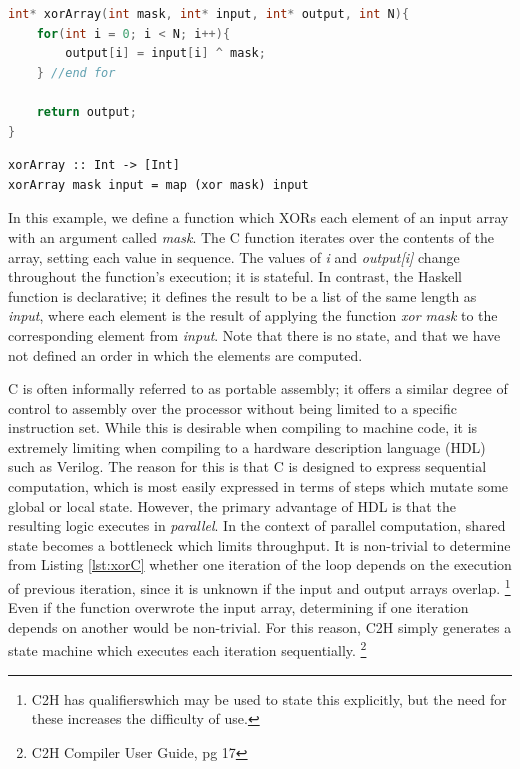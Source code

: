 \documentclass[english,onecolumn]{article}
\begin{document}
\begin{lstlisting}[language=C, caption={XORing an array in C.}, label={lst:xorC}]
int* xorArray(int mask, int* input, int* output, int N){
    for(int i = 0; i < N; i++){
        output[i] = input[i] ^ mask;
    } //end for

    return output;
}
\end{lstlisting}

\begin{lstlisting}[caption={XORing an array in Haskell.}, label={lst:xorH}]
xorArray :: Int -> [Int]
xorArray mask input = map (xor mask) input
\end{lstlisting}

In this example, we define a function which XORs each element of an input array with an argument called \textit{mask}. The C function iterates over the contents of the array, setting each value in sequence. The values of \textit{i} and \textit{output[i]} change throughout the function's execution; it is stateful. In contrast, the Haskell function is declarative; it defines the result to be a list of the same length as \textit{input}, where each element is the result of applying the function \textit{xor mask} to the corresponding element from \textit{input}. Note that there is no state, and that we have not defined an order in which the elements are computed.

C is often informally referred to as portable assembly; it offers a similar degree of control to assembly over the processor without being limited to a specific instruction set. While this is desirable when compiling to machine code, it is extremely limiting when compiling to a hardware description language (HDL) such as Verilog.
The reason for this is that C is designed to express sequential computation, which is most easily expressed in terms of steps which mutate some global or local state. However, the primary advantage of HDL is that the resulting logic executes in \textit{parallel}. In the context of parallel computation, shared state becomes a bottleneck which limits throughput.
It is non-trivial to determine from Listing \ref{lst:xorC} whether one iteration of the loop depends on the execution of previous iteration, since it is unknown if the input and output arrays overlap.%
%
\footnote{C2H has qualifiers\footnotemark which may be used to state this explicitly, but the need for these increases the difficulty of use.}
Even if the function overwrote the input array, determining if one iteration depends on another would be non-trivial. For this reason, C2H simply generates a state machine which executes each iteration sequentially.%
\footnote{C2H Compiler User Guide, pg 17}
\end{document}
